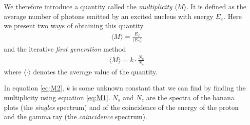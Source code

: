 \documentclass[a4paper,12pt]{article}
\newcommand{\equ}[1]{{\small\begin{align}#1\end{align}}}
\begin{document}
We therefore introduce a quantity called the \textit{multiplicity}
$\langle M \rangle$.
It is defined as the average number of photons emitted by
an excited nucleus with energy $E_x$.
Here we present two ways of obtaining this quantity
\equ{\langle M \rangle =\frac{E_x}{\langle E_\gamma\rangle}\label{eq:M1}}
and the iterative \textit{first generation} method
\equ{\langle M \rangle = k\cdot \frac{N_c}{N_s}\label{eq:M2}}
where $\langle\cdot\rangle$ denotes the average value of the quantity.

In equation \ref{eq:M2}, $k$ is some unknown constant that we can
find by finding the multiplicity using equation \ref{eq:M1}.
$N_s$ and $N_c$ are the spectra of the banana plots 
(the \textit{singles} spectrum) and of the coincidence of the energy of
the proton and the gamma ray (the \textit{coincidence} spectrum).
\end{document}
